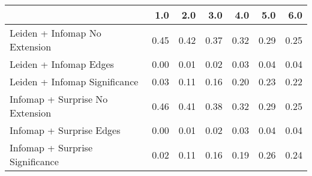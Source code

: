 \begin{tabular}{lrrrrrr}
\toprule
{} &  1.0 &  2.0 &  3.0 &  4.0 &  5.0 &  6.0 \\
\midrule
Leiden + Infomap No Extension   & 0.45 & 0.42 & 0.37 & 0.32 & 0.29 & 0.25 \\
Leiden + Infomap Edges          & 0.00 & 0.01 & 0.02 & 0.03 & 0.04 & 0.04 \\
Leiden + Infomap Significance   & 0.03 & 0.11 & 0.16 & 0.20 & 0.23 & 0.22 \\
Infomap + Surprise No Extension & 0.46 & 0.41 & 0.38 & 0.32 & 0.29 & 0.25 \\
Infomap + Surprise Edges        & 0.00 & 0.01 & 0.02 & 0.03 & 0.04 & 0.04 \\
Infomap + Surprise Significance & 0.02 & 0.11 & 0.16 & 0.19 & 0.26 & 0.24 \\
\bottomrule
\end{tabular}
